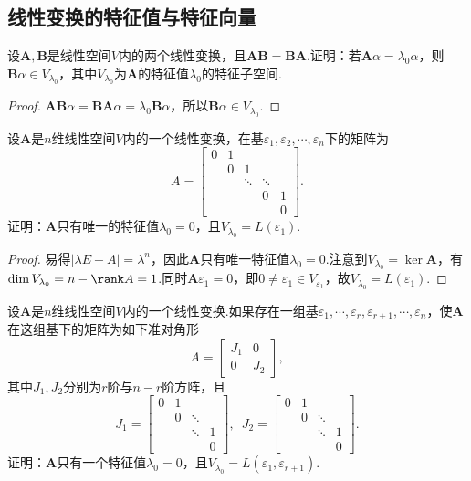 \subsection{线性变换的特征值与特征向量}
\begin{prob}[2]
	设$\bm A,\bm B$是线性空间$V$内的两个线性变换，且$\bm{AB}=\bm{BA}$.证明：若$\bm A\alpha=\lambda_0\alpha$，则$\bm B\alpha\in V_{\lambda_0}$，其中$V_{\lambda_0}$为$\bm A$的特征值$\lambda_0$的特征子空间.
\end{prob}
\begin{proof}
	$\bm{AB}\alpha=\bm{BA}\alpha=\lambda_0\bm B\alpha$，所以$\bm B\alpha\in V_{\lambda_0}$.
\end{proof}
\begin{prob}[3]
	设$\bm A$是$n$维线性空间$V$内的一个线性变换，在基$\varepsilon_1,\varepsilon_2,\cdots,\varepsilon_n$下的矩阵为
	\[
		A=\begin{bmatrix}
			0 & 1 &        &            \\
			  & 0 & 1      &        &   \\
			  &   & \ddots & \ddots &   \\
			  &   &        & 0      & 1 \\
			  &   &        &        & 0
		\end{bmatrix}.
	\]
	证明：$\bm A$只有唯一的特征值$\lambda_0=0$，且$V_{\lambda_0}=L(\varepsilon_1)$.
\end{prob}
\begin{proof}
	易得$|\lambda E-A|=\lambda^n$，因此$\bm A$只有唯一特征值$\lambda_0=0$.注意到$V_{\lambda_0}=\ker\bm A$，有$\dim V_{\lambda_0}=n-\rank A=1$.同时$\bm A\varepsilon_1=0$，即$0\ne\varepsilon_1\in V_{\varepsilon_1}$，故$V_{\lambda_0}=L(\varepsilon_1)$.
\end{proof}
\begin{prob}[4]
	设$\bm A$是$n$维线性空间$V$内的一个线性变换.如果存在一组基$\varepsilon_1,\cdots,\varepsilon_r,\varepsilon_{r+1},\cdots,\varepsilon_n$，使$\bm A$在这组基下的矩阵为如下准对角形
	\[
		A=\begin{bmatrix}
			J_1 & 0   \\
			0   & J_2
		\end{bmatrix},
	\]
	其中$J_1,J_2$分别为$r$阶与$n-r$阶方阵，且
	\[
		J_1=\begin{bmatrix}
			0 & 1 &        &   \\
			  & 0 & \ddots &   \\
			  &   & \ddots & 1 \\
			  &   &        & 0
		\end{bmatrix},\enspace J_2=\begin{bmatrix}
			0 & 1 &        &   \\
			  & 0 & \ddots &   \\
			  &   & \ddots & 1 \\
			  &   &        & 0
		\end{bmatrix}.
	\]
	证明：$\bm A$只有一个特征值$\lambda_0=0$，且$V_{\lambda_0}=L(\varepsilon_1,\varepsilon_{r+1})$.
\end{prob}
